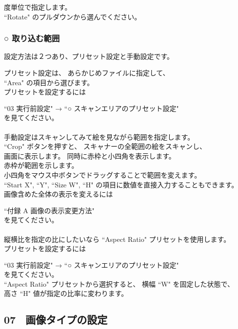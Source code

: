 \documentclass[a4paper,10pt]{article}
\begin{document}
 度単位で指定します。\\
“Rotate" のプルダウンから選んでください。\\

\subsubsection*{○ 取り込む範囲}

\noindent 設定方法は２つあり、プリセット設定と手動設定です。

\newpage

\noindent プリセット設定は、 あらかじめファイルに指定して、\\
“Area" の項目から選びます。\\
プリセットを設定するには\par
“03 実行前設定" → “○ スキャンエリアのプリセット設定"\\
を見てください。\\
\\
手動設定はスキャンしてみて絵を見ながら範囲を指定します。\\
“Crop" ボタンを押すと、 スキャナーの全範囲の絵をスキャンし、\\
画面に表示します。 同時に赤枠と小四角を表示します。\\
赤枠が範囲を示します。\\
小四角をマウス中ボタンでドラッグすることで範囲を変えます。\\
“Start X", “Y", “Size W", “H" の項目に数値を直接入力することもできます。\\
画像含めた全体の表示を変えるには\par
“付録 A 画像の表示変更方法"\\
を見てください。\\
\\
縦横比を指定の比にしたいなら “Aspect Ratio" プリセットを使用します。\\
プリセットを設定するには\par
“03 実行前設定" → “○ スキャンエリアのプリセット設定"\\
を見てください。\\
“Aspect Ratio" プリセットから選択すると、 横幅 “W" を固定した状態で、\\
高さ “H" 値が指定の比率に変わります。

\newpage

\subsection*{07 \ 画像タイプの設定}
\end{document}
